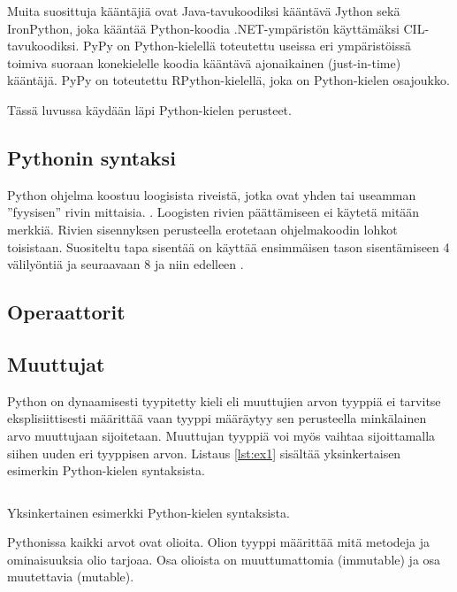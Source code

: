 \documentclass[finnish]{tktltiki2}
\theoremstyle{definition}
\theoremstyle{remark}
\begin{document}
Muita suosittuja kääntäjiä ovat Java-tavukoodiksi kääntävä Jython sekä IronPython, joka kääntää Python-koodia .NET-ympäristön käyttämäksi CIL-tavukoodiksi. PyPy on Python-kielellä toteutettu useissa eri ympäristöissä toimiva suoraan konekielelle koodia kääntävä ajonaikainen (just-in-time) kääntäjä. PyPy on toteutettu RPython-kielellä, joka on Python-kielen osajoukko.

Tässä luvussa käydään läpi Python-kielen perusteet.

\subsection{Pythonin syntaksi}

Python ohjelma koostuu loogisista riveistä, jotka ovat yhden tai useamman ''fyysisen'' rivin mittaisia. \cite{martelli2006python}. Loogisten rivien päättämiseen ei käytetä mitään merkkiä. Rivien sisennyksen perusteella erotetaan ohjelmakoodin lohkot toisistaan. Suositeltu tapa sisentää on käyttää ensimmäisen tason sisentämiseen 4 välilyöntiä ja seuraavaan 8 ja niin edelleen \cite{pep8}. 

\subsection{Operaattorit}

\subsection{Muuttujat}

Python on dynaamisesti tyypitetty kieli eli muuttujien arvon tyyppiä ei tarvitse eksplisiittisesti määrittää vaan tyyppi määräytyy sen perusteella minkälainen arvo muuttujaan sijoitetaan. Muuttujan tyyppiä voi myös vaihtaa sijoittamalla siihen uuden eri tyyppisen arvon. Listaus \ref{lst:ex1} sisältää yksinkertaisen esimerkin Python-kielen syntaksista.

\begin{listing}
    \inputminted{python}{code/foo.py}
    \label{lst:ex1}
    \caption{Yksinkertainen esimerkki Python-kielen syntaksista.}
\end{listing}

Pythonissa kaikki arvot ovat olioita. Olion tyyppi määrittää mitä metodeja ja ominaisuuksia olio tarjoaa. Osa olioista on muuttumattomia (immutable) ja osa muutettavia (mutable).
\end{document}
